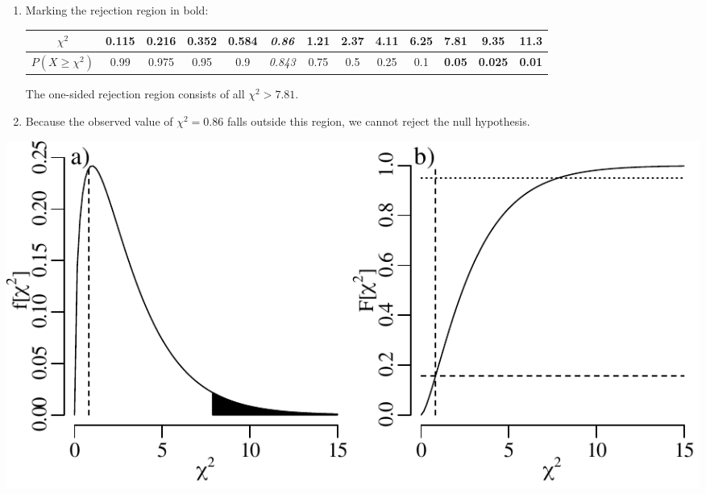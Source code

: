 \begin{enumerate}
\item Marking the rejection region in bold:
  
  \begin{center}
    \begin{tabular}{c|c@{\gap}c@{\gap}c@{\gap}c@{\gap}
        c@{\gap}c@{\gap}c@{\gap}c@{\gap}c@{\gap}c@{\gap}c@{\gap}c}
      $\chi^2$ & 0.115 & 0.216 & 0.352 & 0.584 & \textit{0.86} &
      1.21 & 2.37 & 4.11 & 6.25 & \textbf{7.81} &
      \textbf{9.35} & \textbf{11.3} \\ \hline
      $P(X\geq{\chi^2})$ & 0.99 & 0.975 & 0.95 & 0.9 & \textit{0.843} & 
      0.75 & 0.5 & 0.25 & 0.1 & \textbf{0.05} &
      \textbf{0.025} & \textbf{0.01}
    \end{tabular}
  \end{center}

  The one-sided rejection region consists of all $\chi^2>{7.81}$.

\item Because the observed value of $\chi^2=0.86$ falls outside this
  region, we cannot reject the null hypothesis.

\end{enumerate}

\noindent\begin{minipage}[t][][b]{.6\textwidth}
  \includegraphics[width=\textwidth]{../figures/chi22.pdf}\\
\end{minipage}
\begin{minipage}[t][][t]{.4\textwidth}
  \label{fig:chi22}
\end{minipage}

